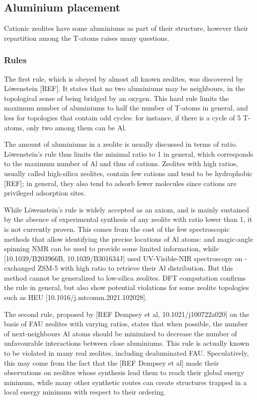 \documentclass[main.tex]{subfiles}
\begin{document}
\subsection{Aluminium placement}

Cationic zeolites have some aluminiums as part of their structure, however their repartition among the T-atoms raises many questions.

\subsubsection{Rules}

The first rule, which is obeyed by almost all known zeolites, was discovered by L\"owenstein [REF]. It states that no two aluminiums may be neighbours, in the topological sense of being bridged by an oxygen. This hard rule limits the maximum number of aluminiums to half the number of T-atoms in general, and less for topologies that contain odd cycles: for instance, if there is a cycle of 5 T-atoms, only two among them can be Al.

The amount of aluminiums in a zeolite is usually discussed in terms of \SiAl ratio. L\"owenstein's rule thus limits the minimal \SiAl ratio to 1 in general, which corresponds to the maximum number of Al and thus of cations. Zeolites with high \SiAl ratios, usually called high-silica zeolites, contain few cations and tend to be hydrophobic [REF]; in general, they also tend to adsorb fewer molecules since cations are privileged adsorption sites.

While L\"owenstein's rule is widely accepted as an axiom, and is mainly sustained by the absence of experimental synthesis of any zeolite with \SiAl ratio lower than 1, it is not currently proven. This comes from the cost of the few spectroscopic methods that allow identifying the precise locations of Al atoms:  and  magic-angle spinning NMR can be used to provide some limited information, while [10.1039/B203966B, 10.1039/B301634J] used UV-Visible-NIR spectroscopy on -exchanged ZSM-5 with high \SiAl ratio to retrieve their Al distribution. But this method cannot be generalized to low-silica zeolites. DFT computation confirms the rule in general, but also show potential violations for some zeolite topologies such as HEU [10.1016/j.mtcomm.2021.102028].

The second rule, proposed by [REF Dempsey et al, 10.1021/j100722a020] on the basis of FAU zeolites with varying \SiAl ratios, states that when possible, the number of next-neighbours Al atoms should be minimized to decrease the number of unfavourable interactions between close aluminiums. This rule is actually known to be violated in many real zeolites, including dealuminated FAU. Speculatively, this may come from the fact that the [REF Dempsey et al] made their observations on zeolites whose synthesis lead them to reach their global energy minimum, while many other synthetic routes can create structures trapped in a local energy minimum with respect to their \SiAl ordering.
\end{document}
